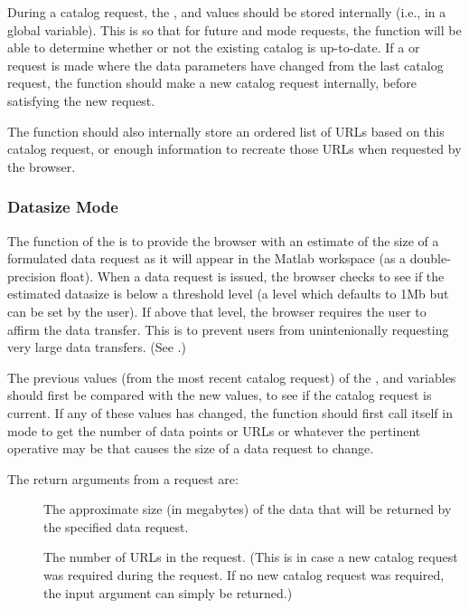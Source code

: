 During a catalog request, the ,  and
 values should be stored internally (i.e., in a global
variable).  This is so that for future  and 
mode requests, the  function will be able to determine
whether or not the existing catalog is up-to-date.  If a  or
 request is made where the data parameters have
changed from the last catalog request, the  function should
make a new catalog request internally, before satisfying the new
request. 

The  function should also internally store
an ordered list of URLs based on this catalog request, or enough
information to recreate those URLs when requested by the browser.


\subsubsection{Datasize Mode}

The function of the  is to provide the browser with
an estimate of the size of a formulated data request as it will appear
in the Matlab workspace (as a double-precision float).  When a data
  request is issued, the browser checks to see if the
estimated datasize is below a threshold level (a level which defaults
to 1Mb but can be set by the user).  If above that level, the browser
requires the user to affirm the data transfer.  This is to prevent
users from unintenionally requesting very large data transfers. (See
.)

The previous values (from the most recent catalog request) of the
,  and  variables should first
be compared with the new values, to see if the catalog request is
current.  If any of these values has changed, the  function
should first call itself in  mode to get the number of data
points or URLs or whatever the pertinent operative may be that causes
the size of a data request to change.

The return arguments from a  request are:


\begin{description}
  
\item[] The approximate size (in megabytes) of the data
  that will be returned by the specified data request.
\item[] The number of URLs in the request.  (This is in
  case a new catalog request was required during the 
  request.  If no new catalog request was required, the input
   argument can simply be returned.)
\end{description}


